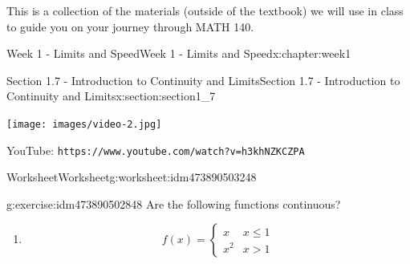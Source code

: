 \documentclass[oneside,10pt,]{book}
\newcommand{\mono}[1]{\texttt{#1}}
\numberwithin{equation}{section}
\newlength{\qrsize}
\newlength{\previewwidth}
\begin{document}
This is a collection of the materials (outside of the textbook) we will use in class to guide you on your journey through MATH 140.%
%
%
\typeout{************************************************}
\typeout{************************************************}
%
\begin{chapterptx}{Week 1 - Limits and Speed}{}{Week 1 - Limits and Speed}{}{}{x:chapter:week1}
%
%
\typeout{************************************************}
\typeout{************************************************}
%
\begin{sectionptx}{Section 1.7 - Introduction to Continuity and Limits}{}{Section 1.7 - Introduction to Continuity and Limits}{}{}{x:section:section1_7}
\setlength{\qrsize}{9em}
\setlength{\previewwidth}{\linewidth}
\addtolength{\previewwidth}{-\qrsize}
\begin{tcbraster}[raster columns=2, raster column skip=1pt, raster halign=center, raster force size=false, raster left skip=0pt, raster right skip=0pt]%
\begin{tcolorbox}[previewstyle, width=\previewwidth]%
\texttt{[image: images/video-2.jpg]}%
\end{tcolorbox}%
\begin{tcolorbox}[qrstyle]%
{\hypersetup{urlcolor=black}}%
\end{tcolorbox}%
\begin{tcolorbox}[captionstyle]%
\small YouTube: \mono{https://www.youtube.com/watch?v=h3khNZKCZPA}\end{tcolorbox}%
\end{tcbraster}%
%
%
\typeout{************************************************}
\typeout{************************************************}
%
\begin{worksheet-subsection}{Worksheet}{}{Worksheet}{}{}{g:worksheet:idm473890503248}
\begin{divisionexercise}{1}{}{}{g:exercise:idm473890502848}%
Are the following functions continuous?%
%
\begin{enumerate}[label=(\alph*)]
\item{}%
\begin{equation*}
f(x) = \left\{ \begin{matrix} x & x \leq 1 \\ x^2 & x > 1 \end{matrix} \right. 

\end{equation*}
\end{enumerate}
\end{divisionexercise}
\end{worksheet-subsection}
\end{sectionptx}
\end{chapterptx}
\end{document}
